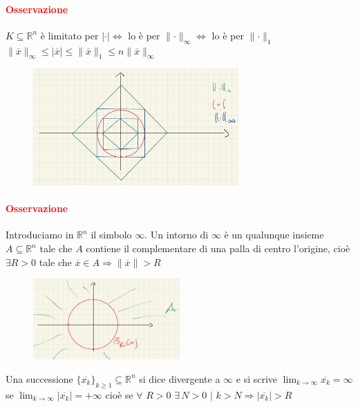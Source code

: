 \documentclass{article}
\newcommand{\R}{\mathbb{R}}
\begin{document}
\paragraph{\textcolor{red}{Osservazione}}
$K \subseteq \R^n$ è limitato per $|\cdot| \Leftrightarrow$ lo è per $\parallel \cdot \parallel_\infty \Leftrightarrow$ lo è per $\parallel \cdot \parallel_1$\\
$\parallel \overline{x} \parallel_\infty \leq |\overline{x}|\leq \parallel \overline{x} \parallel_1 \leq n \parallel\overline{x} \parallel_\infty$\\
\begin{figure}[!h]
    \centering
    \includegraphics[width=0.7\textwidth]{Screenshot from 2023-03-28 20-55-22}
\end{figure}

\paragraph{\textcolor{red}{Osservazione}}
Introduciamo in $\R^n$ il simbolo $\infty$. Un intorno di $\infty$ è un qualunque insieme $A \subseteq \R^n$ tale che $A$ contiene il complementare di una palla di centro l'origine, cioè $\exists R>0$ tale che $\overline{x} \in A \Rightarrow \parallel \overline{x} \parallel > R$\\
\begin{figure}[!h]
    \centering
    \includegraphics[width=0.5\textwidth]{Screenshot from 2023-03-28 21-04-48}
\end{figure}

Una successione $\{\overline{x_k}\}_{k\geq 1} \subseteq \R^n$ si dice divergente a $\infty$ e si scrive $\lim_{k \rightarrow \infty} \overline{x_k}=\infty$ se $\lim_{k \rightarrow \infty} |\overline{x_k}|=+\infty$ cioè se $\forall\,\, R > 0\,\, \exists\, N >0\,\,|\,\,k>N \Rightarrow |\overline{x_k}|>R$
\end{document}
